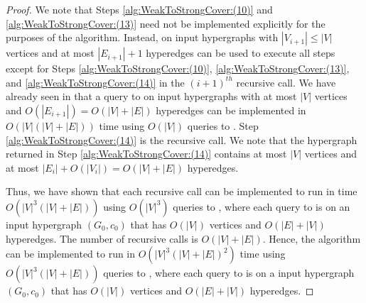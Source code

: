 \begin{proof}
We note that Steps \ref{alg:WeakToStrongCover:(10)} and \ref{alg:WeakToStrongCover:(13)} need not be implemented explicitly for the purposes of the algorithm. Instead,  on input hypergraphs with $|V_{i+1}|\le |V|$ vertices and at most $|E_{i+1}|+1$ hyperedges can be used to execute all steps except for Steps \ref{alg:WeakToStrongCover:(10)}, \ref{alg:WeakToStrongCover:(13)}, and \ref{alg:WeakToStrongCover:(14)} in the $(i+1)^{th}$ recursive call. 
We have already seen in  that a query to  on input hypergraphs with at most $|V|$ vertices and $O(|E_{i+1}|) = O(|V| + |E|)$ hyperedges can be implemented in  $O(|V|(|V|+|E|))$ time using $O(|V|)$ queries to . 
Step \ref{alg:WeakToStrongCover:(14)} is the recursive call. We note that the hypergraph returned in Step \ref{alg:WeakToStrongCover:(14)} contains at most $|V|$ vertices and at most $|E_i| + O(|V_i|)= O(|V| + |E|)$ hyperedges. 

Thus, we have shown that each recursive call can be implemented to run in time $O(|V|^3(|V| + |E|))$ using $O(|V|^3)$ queries to , where each query to  is on an input hypergraph $(G_0, c_0)$ that has $O(|V|)$ vertices and $O(|E|+|V|)$ hyperedges. The number of recursive calls is $O(|V|+|E|)$. 
Hence, the algorithm can be implemented to run in $O(|V|^3(|V| + |E|)^2)$ time using $O(|V|^3(|V|+|E|))$ queries to , where each query to  is on a input hypergraph $(G_0, c_0)$ that has $O(|V|)$ vertices and $O(|E|+|V|)$ hyperedges. 
\end{proof}